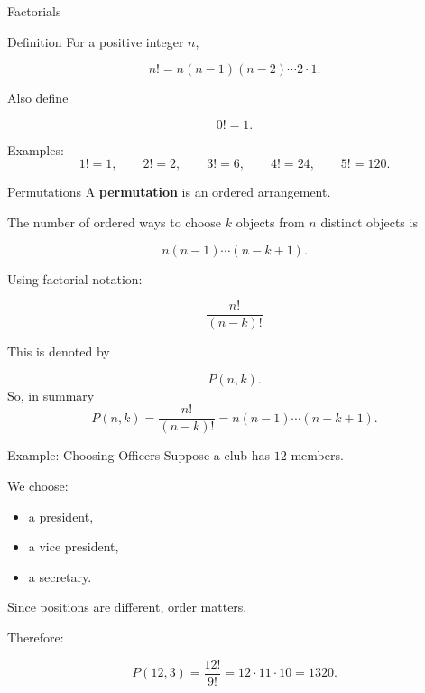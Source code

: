 
\begin{frame}{Factorials}
\begin{keybox}{Definition}
For a positive integer $n$,

\[
n! = n(n-1)(n-2)\cdots2\cdot1.
\]

Also define

\[
0! = 1.
\]
\end{keybox}

\vspace{0.25cm}

Examples:
\[
1!=1,
\qquad
2!=2,
\qquad
3!=6,
\qquad
4!=24,
\qquad
5!=120.
\]
\end{frame}

\begin{frame}{Permutations}
A \textbf{permutation} is an ordered arrangement.

\vspace{0.25cm}

The number of ordered ways to choose $k$ objects from $n$ distinct objects is

\[
n(n-1)\cdots(n-k+1).
\]

Using factorial notation:

\[
{
\frac{n!}{(n-k)!}
}
\]

This is denoted by

\[
P(n,k).
\]
So, in summary
$$P(n,k) = \frac{n!}{(n-k)!} = n(n-1)\cdots(n-k+1).$$

\end{frame}

\begin{frame}{Example: Choosing Officers}
Suppose a club has $12$ members.

We choose:
\begin{itemize}
    \item a president,
    \item a vice president,
    \item a secretary.
\end{itemize}

Since positions are different, order matters.

\vspace{0.25cm}

Therefore:

\[
P(12,3) = \frac{12! }{9!}=12\cdot11\cdot10
=
1320.
\]

\end{frame}


